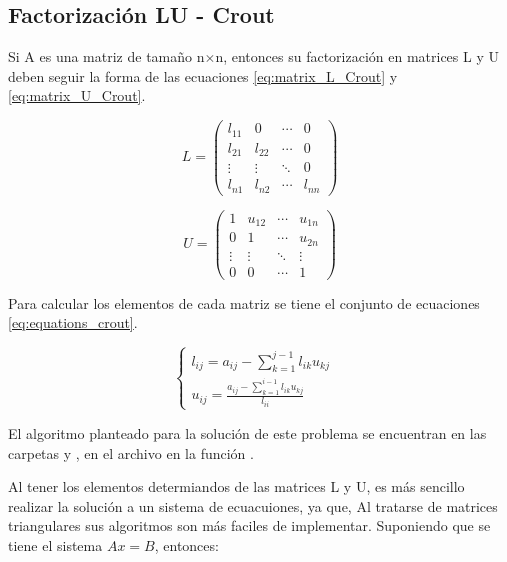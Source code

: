 \subsection{Factorización LU - Crout}

Si A es una matriz de tamaño n$\times$n, entonces su factorización en matrices L y U deben seguir la forma de las ecuaciones \ref{eq:matrix_L_Crout} y \ref{eq:matrix_U_Crout}.

\begin{equation}
    L = \begin{pmatrix}
        l_{11} & 0      & \cdots & 0      \\
        l_{21} & l_{22} & \cdots & 0      \\
        \vdots & \vdots & \ddots & 0      \\
        l_{n1} & l_{n2} & \cdots & l_{nn}
    \end{pmatrix}
    \label{eq:matrix_L_Crout}
\end{equation}

\begin{equation}
    U = \begin{pmatrix}
        1      & u_{12} & \cdots & u_{1n} \\
        0      & 1      & \cdots & u_{2n} \\
        \vdots & \vdots & \ddots & \vdots \\
        0      & 0      & \cdots & 1
    \end{pmatrix}
    \label{eq:matrix_U_Crout}
\end{equation}

Para calcular los elementos de cada matriz se tiene el conjunto de ecuaciones \ref{eq:equations_crout}.

\begin{equation}
    \begin{cases}
        l_{ij} = a_{ij} - \sum_{k=1}^{j-1} l_{ik}u_{kj} & \\
        u_{ij} = \frac{a_{ij}-\sum\limits_{k=1}^{i-1}l_{ik}u_{kj}}{l_{ii}}
    \end{cases}
    \label{eq:equations_crout}
\end{equation}

El algoritmo planteado para la solución de este problema se encuentran en las carpetas  y , en el archivo  en la función .

Al tener los elementos determiandos de las matrices L y U, es más sencillo realizar la solución a un sistema de ecuacuiones, ya que, Al tratarse de matrices triangulares sus algoritmos son más faciles de implementar. Suponiendo que se tiene el sistema $Ax=B$, entonces:

